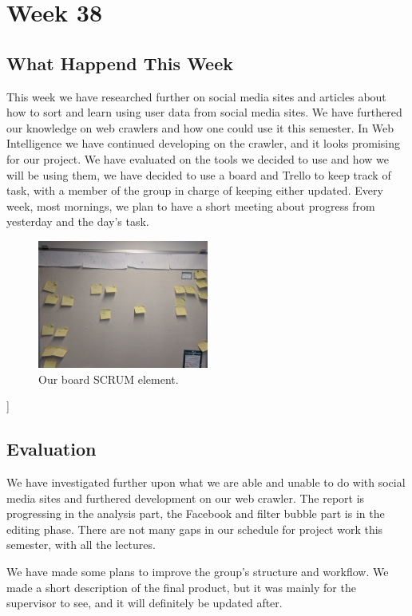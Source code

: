 \section*{Week 38} \subsection*{What Happend This Week} 
This week we have researched further on social media sites and articles about
how to sort and learn using user data from social media sites. We have furthered
our knowledge on web crawlers and how one could use it this semester. In Web
Intelligence we have continued developing on the crawler, and it looks promising
for our project. We have evaluated on the tools we decided to use and how we
will be using them, we have decided to use a board and Trello to keep track of
task, with a member of the group in charge of keeping either updated. Every
week, most mornings, we plan to have a short meeting about progress from
yesterday and the day's task.

\begin{figure}[H] \centering \includegraphics[width =
0.5\textwidth]{figures/Board.jpg}
	\caption{Our board SCRUM element.}
\end{figure}]

\subsection*{Evaluation}
We have investigated further upon what we are able and unable to do with social
media sites and furthered development on our web crawler. The report is
progressing in the analysis part, the Facebook and filter bubble part is in the
editing phase. There are not many gaps in our schedule for project work this
semester, with all the lectures.

We have made some plans to improve the group's structure and workflow. We made a
short description of the final product, but it was mainly for the supervisor to
see, and it will definitely be updated after.

